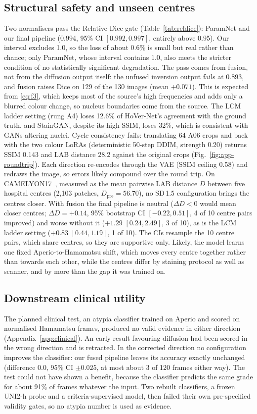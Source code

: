 \subsection{Structural safety and unseen centres}
Two normalisers pass the Relative Dice gate (Table~\ref{tab:reldice}): ParamNet and our final pipeline
(0.994, 95\% CI $[0.992, 0.997]$, entirely above 0.95). Our interval excludes 1.0, so the loss of about 0.6\%
is small but real rather than chance; only ParamNet, whose interval contains 1.0, also meets the stricter condition of no
statistically significant degradation. The pass comes from fusion, not from the diffusion
output itself: the unfused inversion output fails at 0.893, and fusion raises Dice on 129 of the 130 images
(mean $+0.071$). This is expected from \eqref{eq:f3}, which keeps most of the source's high frequencies and adds
only a blurred colour change, so nucleus boundaries come from the source. The LCM ladder setting (rung A4)
loses 12.6\% of HoVer-Net's agreement with the ground truth, and StainGAN, despite its high SSIM, loses 32\%,
which is consistent with GANs altering nuclei. Cycle consistency fails: translating 64 A06 crops \AtoH{} and
back with the two colour LoRAs (deterministic 50-step DDIM, strength 0.20) returns SSIM 0.143 and LAB distance
28.2 against the original crops (Fig.~\ref{fig:app-roundtrip}). Each direction re-encodes through the VAE
(SSIM ceiling 0.58) and redraws the image, so errors likely compound over the round trip. On CAMELYON17~\cite{bandi2018camelyon17}, measured as the
mean pairwise LAB distance $D$ between five hospital centres (2{,}103 patches, $D_{\mathrm{pre}}=56.70$), no
SD\,1.5 configuration brings the centres closer. With fusion the final pipeline is neutral ($\Delta D<0$ would mean closer centres;
$\Delta D=+0.14$, 95\% bootstrap CI $[-0.22, 0.51]$, 4 of 10 centre pairs improved) and worse without it
($+1.29$ $[0.24, 2.49]$, 3 of 10), as is the LCM ladder setting ($+0.83$ $[0.44, 1.19]$, 1 of 10). The CIs
resample the 10 centre pairs, which share centres, so they are supportive only. Likely, the model learns one fixed
Aperio-to-Hamamatsu shift, which moves every centre together rather than towards each other, while the
centres differ by staining protocol as well as scanner, and by more than the gap it was trained on.

\subsection{Downstream clinical utility}
The planned clinical test, an atypia classifier trained on Aperio and scored on normalised Hamamatsu
frames, produced no valid evidence in either direction (Appendix~\ref{app:clinical}). An early result
favouring diffusion had been scored in the wrong direction and is retracted. In the
corrected direction no configuration improves the classifier: our fused pipeline leaves its accuracy
exactly unchanged (difference 0.0, 95\% CI $\pm0.025$, at most about 3 of 120 frames either way). The test
could not have shown a benefit, because the classifier predicts the same grade for about 91\% of frames
whatever the input. Two rebuilt classifiers, a frozen UNI2-h probe and a criteria-supervised model, then
failed their own pre-specified validity gates, so no atypia number is used as evidence.

